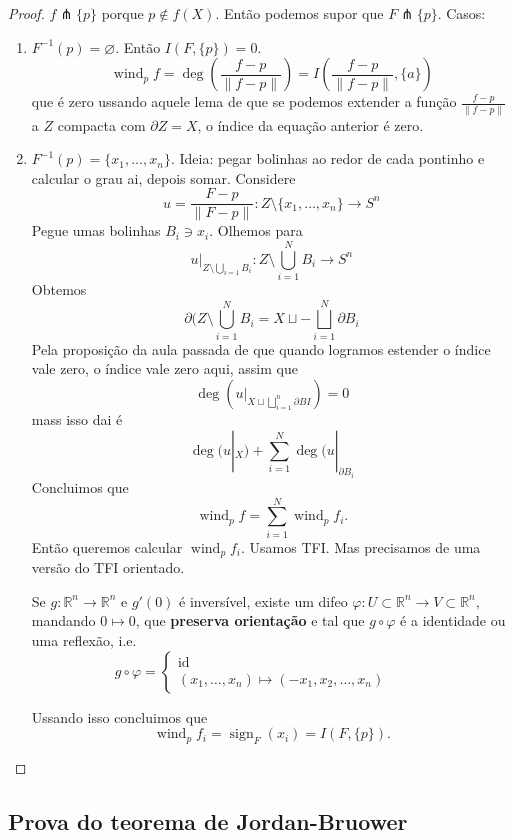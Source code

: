 \begin{proof}\leavevmode
\(f \pitchfork \{p\}\) porque \(p \not \in f(X)\). Então podemos supor que \(F \pitchfork  \{ p\}\). Casos:
\begin{enumerate}
\item \(F^{-1}(p)=\varnothing\). Então \(I(F,\{p\})=0\).
	\[\operatorname{wind}_pf=\operatorname{deg} \left(\frac{f-p}{\|f-p\|}\right) =I\left(\frac{f-p}{\|f-p\|}, \{ a\}\right) \]
	que é zero ussando aquele lema de que se podemos extender a função \(\frac{f-p}{\|f-p\|}\) a \(Z\) compacta com \(\partial  Z=X\), o índice da equação anterior é zero.
	
\item \(F^{-1}(p)=\{x_1,\ldots,x_n\}\). {\color{6}Ideia: pegar bolinhas ao redor de cada pontinho e calcular o grau ai, depois somar.} Considere
	\[u=\frac{F-p}{\|F-p\|}:Z\setminus \{x_1,\ldots,x_n\}\to S^{n}\]
Pegue umas bolinhas \(B_i \ni x_i\). Olhemos para
\[u|_{Z \setminus \bigcup_{i=1}B_i}: Z\setminus \bigcup_{i=1}^N B_i \to S^{n}\]
Obtemos
\[\partial (Z\setminus \bigcup_{i=1}^N B_i=X \sqcup - \bigsqcup_{i=1}^N \partial B_i\]
Pela proposição da aula passada de que quando logramos estender o índice vale zero, o índice vale zero aqui, assim que
\[\operatorname{deg}\left(u|_{X\sqcup \bigsqcup_{i=1}^n \partial B I}\right) =0\]
mass isso dai é
\[\operatorname{deg}(u|_{X})+ \sum_{i=1}^N \operatorname{deg}(u|_{\partial B_i}\]
Concluimos que
\[\operatorname{wind}_pf= \sum_{i=1}^N \operatorname{wind}_p f_i.\]
Então queremos calcular \(\operatorname{wind}_pf_i\). Usamos TFI. Mas precisamos de uma versão do TFI orientado.

\begin{thm}\leavevmode
Se \(g: \mathbb{R}^n \to \mathbb{R}^n\) e \(g'(0)\) é inversível, existe um difeo \(\varphi:U \subset \mathbb{R}^n \to V \subset \mathbb{R}^n\), mandando \(0 \mapsto  0\), que \textbf{preserva orientação}  e tal que  \(g \circ \varphi\) é a identidade ou uma reflexão, i.e.
\[g \circ \varphi=\begin{cases}
	\operatorname{id}\qquad \\
	(x_1,\ldots,x_n)\mapsto (-x_1,x_2,\ldots,x_n)\qquad &
\end{cases}\]
\end{thm}
Ussando isso concluimos que
\[\operatorname{wind}_pf_i=\operatorname{sign}_F(x_i)=I(F,\{p\}).\]
\end{enumerate}
\end{proof}

\subsection{Prova do teorema de Jordan-Bruower}

